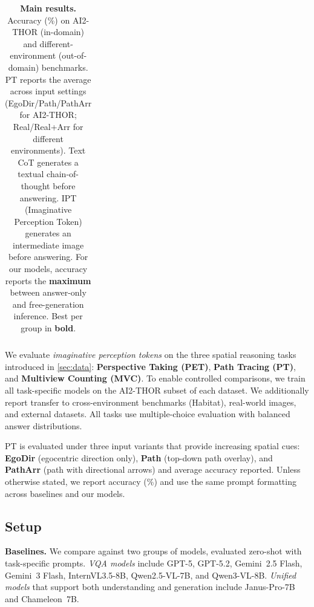 \documentclass{llmxive}
\begin{document}
\begin{table}[t]
\begin{tabular}{l ccc cc}
    \bottomrule
  \end{tabular}
  \label{tab:main_results}
\caption{\textbf{Main results.} Accuracy (\%) on AI2-THOR (in-domain) and different-environment (out-of-domain) benchmarks. PT reports the average across input settings (EgoDir/Path/PathArr for AI2-THOR; Real/Real+Arr for different environments). Text CoT generates a textual chain-of-thought before answering. IPT (Imaginative Perception Token) generates an intermediate image before answering. For our models, accuracy reports the \textbf{maximum} between answer-only and free-generation inference. Best per group in \textbf{bold}.}
\end{table}


We evaluate \emph{imaginative perception tokens} on the three spatial reasoning tasks introduced in \cref{sec:data}: \textbf{Perspective Taking (PET)}, \textbf{Path Tracing (PT)}, and \textbf{Multiview Counting (MVC)}. To enable controlled comparisons, we train all task-specific models on the AI2-THOR subset of each dataset. We additionally report transfer to cross-environment benchmarks (Habitat), real-world images, and external datasets. All tasks use multiple-choice evaluation with balanced answer distributions.

PT is evaluated under three input variants that provide increasing spatial cues: \textbf{EgoDir} (egocentric direction only), \textbf{Path} (top-down path overlay), and \textbf{PathArr} (path with directional arrows) and average accuracy reported. Unless otherwise stated, we report accuracy (\%) and use the same prompt formatting across baselines and our models.

\subsection{Setup}

\noindent\textbf{Baselines.}
We compare against two groups of models, evaluated zero-shot with task-specific prompts.
\emph{VQA models} include GPT-5, GPT-5.2, Gemini~2.5 Flash, Gemini~3 Flash, InternVL3.5-8B, Qwen2.5-VL-7B, and Qwen3-VL-8B.
\emph{Unified models} that support both understanding and generation include Janus-Pro-7B and Chameleon~7B.
\end{document}
